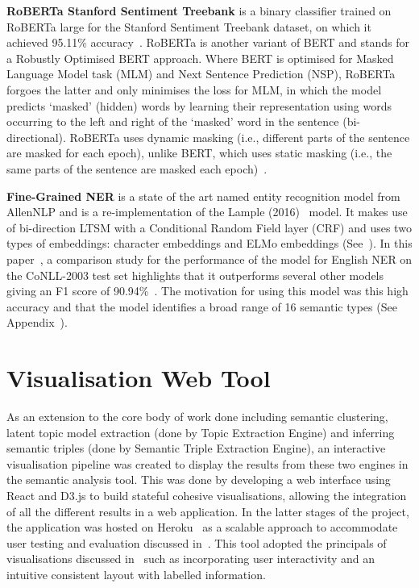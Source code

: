 \textbf{RoBERTa Stanford Sentiment Treebank} is a binary classifier trained on RoBERTa large for the Stanford Sentiment Treebank dataset, on which it achieved 95.11\% accuracy~\cite{roberta}. RoBERTa is another variant of BERT and stands for a Robustly Optimised BERT approach. Where BERT is optimised for Masked Language Model task (MLM) and Next Sentence Prediction (NSP), RoBERTa forgoes the latter and only minimises the loss for MLM, in which the model predicts `masked' (hidden) words by learning their representation using words occurring to the left and right of the `masked' word in the sentence (bi-directional). RoBERTa uses dynamic masking (i.e., different parts of the sentence are masked for each epoch), unlike BERT, which uses static masking (i.e., the same parts of the sentence are masked each epoch)~\cite{roberta}. 

\textbf{Fine-Grained NER} is a state of the art named entity recognition model from AllenNLP and is a re-implementation of the Lample (2016)~\cite{lample} model. It makes use of bi-direction LTSM with a Conditional Random Field layer (CRF) and uses two types of embeddings: character embeddings and ELMo embeddings (See~). In this paper~\cite{lample}, a comparison study for the performance of the model for English NER on the CoNLL-2003 test set highlights that it outperforms several other models giving an F1 score of 90.94\%~\cite{lample}. The motivation for using this model was this high accuracy and that the model identifies a broad range of 16 semantic types (See Appendix~).

\section{Visualisation Web Tool}
As an extension to the core body of work done including semantic clustering, latent topic model extraction (done by Topic Extraction Engine) and inferring semantic triples (done by Semantic Triple Extraction Engine), an interactive visualisation pipeline was created to display the results from these two engines in the semantic analysis tool. 
This was done by developing a web interface using React and D3.js to build stateful cohesive visualisations, allowing the integration of all the different results in a web application. In the latter stages of the project, the application was hosted on Heroku~\cite{heroku} as a scalable approach to accommodate user testing and evaluation discussed in~. This tool adopted the principals of visualisations discussed in~ such as incorporating user interactivity and an intuitive consistent layout with labelled information.